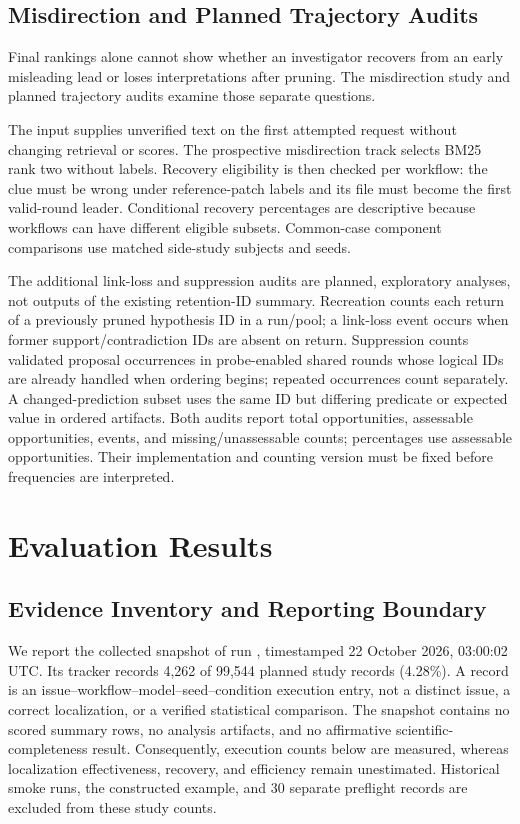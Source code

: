 \documentclass[letterpaper,journal]{IEEEtran}
\newcommand{\code}[1]{\texttt{\detokenize{#1}}}
\begin{document}
\subsection{Misdirection and Planned Trajectory Audits}\label{sec:audits}
Final rankings alone cannot show whether an investigator recovers from an early misleading lead or loses interpretations after pruning. The misdirection study and planned trajectory audits examine those separate questions.

The \code{initial_clue} input supplies unverified text on the first attempted request without changing retrieval or scores. The prospective misdirection track selects BM25 rank two without labels. Recovery eligibility is then checked per workflow: the clue must be wrong under reference-patch labels and its file must become the first valid-round leader. Conditional recovery percentages are descriptive because workflows can have different eligible subsets. Common-case component comparisons use matched side-study subjects and seeds.

The additional link-loss and suppression audits are planned, exploratory analyses, not outputs of the existing retention-ID summary. Recreation counts each return of a previously pruned hypothesis ID in a run/pool; a link-loss event occurs when former support/contradiction IDs are absent on return. Suppression counts validated proposal occurrences in probe-enabled shared rounds whose logical IDs are already handled when ordering begins; repeated occurrences count separately. A changed-prediction subset uses the same ID but differing predicate or expected value in ordered artifacts. Both audits report total opportunities, assessable opportunities, events, and missing/unassessable counts; percentages use assessable opportunities. Their implementation and counting version must be fixed before frequencies are interpreted.

\section{Evaluation Results}\label{sec:results}
\subsection{Evidence Inventory and Reporting Boundary}\label{sec:coverage}
We report the collected snapshot of run \code{ufv-full-v12-20261020-01}, timestamped 22 October 2026, 03:00:02 UTC. Its tracker records 4,262 of 99,544 planned study records (4.28\%). A record is an issue--workflow--model--seed--condition execution entry, not a distinct issue, a correct localization, or a verified statistical comparison. The snapshot contains no scored summary rows, no analysis artifacts, and no affirmative scientific-completeness result. Consequently, execution counts below are measured, whereas localization effectiveness, recovery, and efficiency remain unestimated. Historical smoke runs, the constructed example, and 30 separate preflight records are excluded from these study counts.
\end{document}
